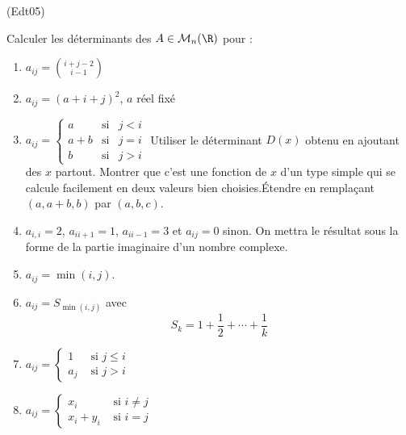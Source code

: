 \begin{tiny}(Edt05)\end{tiny}
Calculer les d{\'e}terminants des $A\in \mathcal{M}_n(\R)$ pour :
\begin{enumerate}
 \item $a_{ij}=\binom{i+j-2}{i-1}$
\item $a_{ij}=(a+i+j)^{2}$, $a$ r{\'e}el fix{\'e}
\item $a_{ij}=\left\{
\begin{array}{ccc}
a & \text{si} & j<i \\
a+b & \text{si} & j=i \\
b & \text{si} & j>i
\end{array}
\right. $\newline
Utiliser le d{\'e}terminant $D(x)$ obtenu en ajoutant des $x$ partout. Montrer que c'est une fonction de $x$ d'un type simple qui se calcule facilement en deux valeurs bien choisies.\newline \'Etendre en remplaçant $(a,a+b,b)$ par $(a,b,c)$. 
\item $a_{i,i}=2$, $a_{i i+1}=1$, $a_{i i-1}=3$ et $a_{i j}=0$ sinon.\newline
On mettra le résultat sous la forme de la partie imaginaire d'un nombre complexe. 
\item $a_{i j}=\min(i,j)$.
\item $a_{i j}=S_{\min(i,j)}$ avec
\begin{displaymath}
 S_k = 1 +\frac{1}{2}+\cdots + \frac{1}{k}
\end{displaymath}
\item $a_{i j}=
\left\lbrace 
\begin{aligned}
 1 &\text{ si }j\leq i \\ a_j &\text{ si }j> i
\end{aligned}\right. $
\item $a_{i j}=
\left\lbrace 
\begin{aligned}
 x_i &\text{ si } i\neq j \\ x_i + y_i &\text{ si } i=j
\end{aligned}\right. $
\end{enumerate}